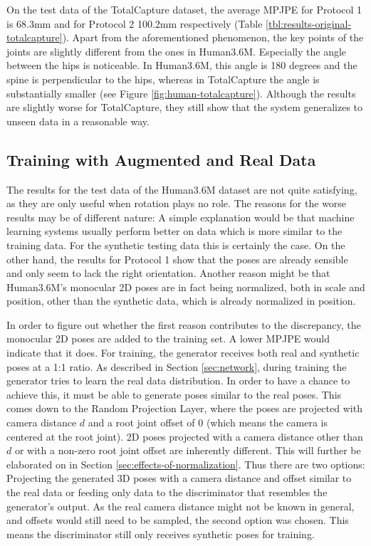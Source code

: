 On the test data of the TotalCapture dataset, the average MPJPE for Protocol 1 is 68.3mm and for Protocol 2 100.2mm respectively (Table \ref{tbl:results-original-totalcapture}).
Apart from the aforementioned phenomenon, the key points of the joints are slightly different from the ones in Human3.6M.
Especially the angle between the hips is noticeable.
In Human3.6M, this angle is 180 degrees and the spine is perpendicular to the hips, whereas in TotalCapture the angle is substantially smaller (see Figure \ref{fig:human-totalcapture}).
Although the results are slightly worse for TotalCapture, they still show that the system generalizes to unseen data in a reasonable way.




\subsection{Training with Augmented and Real Data}
The results for the test data of the Human3.6M dataset are not quite satisfying, as they are only useful when rotation plays no role.
The reasons for the worse results may be of different nature:
A simple explanation would be that machine learning systems usually perform better on data which is more similar to the training data.
For the synthetic testing data this is certainly the case.
On the other hand, the results for Protocol 1 show that the poses are already sensible and only seem to lack the right orientation.
Another reason might be that Human3.6M's monocular 2D poses are in fact being normalized, both in scale and position, other than the synthetic data, which is already normalized in position.

In order to figure out whether the first reason contributes to the discrepancy, the monocular 2D poses are added to the training set.
A lower MPJPE would indicate that it does.
For training, the generator receives both real and synthetic poses at a 1:1 ratio.
As described in Section \ref{sec:network}, during training the generator tries to learn the real data distribution.
In order to have a chance to achieve this, it must be able to generate poses similar to the real poses. 
This comes down to the Random Projection Layer, where the poses are projected with camera distance $d$ and a root joint offset of $0$ (which means the camera is centered at the root joint).
2D poses projected with a camera distance other than $d$ or with a non-zero root joint offset are inherently different.
This will further be elaborated on in Section \ref{sec:effects-of-normalization}.
Thus there are two options:
Projecting the generated 3D poses with a camera distance and offset similar to the real data or feeding only data to the discriminator that resembles the generator's output.
As the real camera distance might not be known in general, and offsets would still need to be sampled, the second option was chosen.
This means the discriminator still only receives synthetic poses for training.

